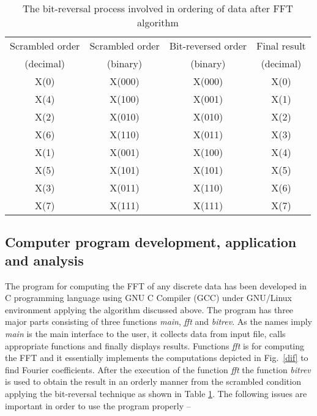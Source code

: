 \documentclass[a4paper,11pt]{report}
\begin{document}
\begin{table}[h]
\centering
\begin{tabular}{|c|c|c|c|}
\hline
Scrambled order & Scrambled order & Bit-reversed order & Final result \\
(decimal) & (binary) & (binary) & (decimal) \\
\hline
X(0) & X(000) & X(000) & X(0) \\
X(4) & X(100) & X(001) & X(1) \\
X(2) & X(010) & X(010) & X(2) \\
X(6) & X(110) & X(011) & X(3) \\
X(1) & X(001) & X(100) & X(4) \\
X(5) & X(101) & X(101) & X(5) \\
X(3) & X(011) & X(110) & X(6) \\
X(7) & X(111) & X(111) & X(7) \\
\hline
\end{tabular}
\caption{The bit-reversal process involved in ordering of data after FFT algorithm} \label{bit}
\end{table}

\subsection{Computer program development, application and analysis}
The program for computing the FFT of any discrete data has been developed in C programming language using GNU C Compiler (GCC) under GNU/Linux environment applying the algorithm discussed above. The program has three major parts consisting of three functions \emph{main}, \emph{fft} and \emph{bitrev}. As the names imply \emph{main} is the main interface to the user, it collects data from input file, calls appropriate functions and finally displays results. Functions \emph{fft} is for computing the FFT and it essentially implements the computations depicted in Fig.~\ref{dif} to find Fourier coefficients. After the execution of the function \emph{fft} the function \emph{bitrev} is used to obtain the result in an orderly manner from the scrambled condition applying the bit-reversal technique as shown in Table \ref{bit}. The following issues are important in order to use the program properly --
\end{document}
